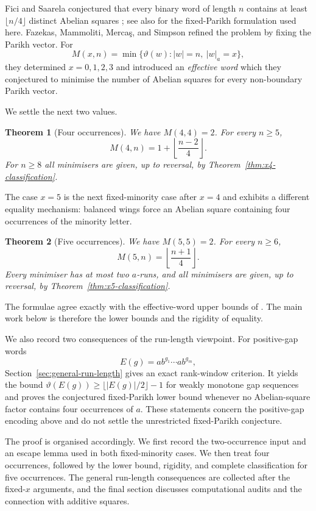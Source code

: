 \documentclass[11pt]{article}
\newtheorem{theorem}{Theorem}[section]
\theoremstyle{definition}
\newcommand{\thetaas}{\vartheta}
\begin{document}
Fici and Saarela conjectured that every binary word of length $n$ contains at least $\lfloor n/4\rfloor$ distinct Abelian squares \cite{FiciSaarela2014}; see also \cite{FMMS2026} for the fixed-Parikh formulation used here. Fazekas, Mammoliti, Merca\c{s}, and Simpson \cite{FMMS2026} refined the problem by fixing the Parikh vector. For
\[
 M(x,n)=\min\{\thetaas(w):|w|=n,\ |w|_a=x\},
\]
they determined $x=0,1,2,3$ and introduced an \emph{effective word} which they conjectured to minimise the number of Abelian squares for every non-boundary Parikh vector.

We settle the next two values.

\begin{theorem}[Four occurrences]\label{thm:x4-main}
We have $M(4,4)=2$. For every $n\ge5$,
\[
 M(4,n)=1+\left\lfloor\frac{n-2}{4}\right\rfloor.
\]
For $n\ge8$ all minimisers are given, up to reversal, by Theorem~\ref{thm:x4-classification}.
\end{theorem}

The case $x=5$ is the next fixed-minority case after $x=4$ and exhibits a different equality mechanism: balanced wings force an Abelian square containing four occurrences of the minority letter.

\begin{theorem}[Five occurrences]\label{thm:x5-main}
We have $M(5,5)=2$. For every $n\ge6$,
\[
 M(5,n)=\left\lfloor\frac{n+1}{4}\right\rfloor.
\]
Every minimiser has at most two $a$-runs, and all minimisers are given, up to reversal, by Theorem~\ref{thm:x5-classification}.
\end{theorem}

The formulae agree exactly with the effective-word upper bounds of \cite[Theorem~12]{FMMS2026}. The main work below is therefore the lower bounds and the rigidity of equality.

We also record two consequences of the run-length viewpoint.  For positive-gap words
\[
 E(g)=ab^{g_1}\cdots ab^{g_m},
\]
Section~\ref{sec:general-run-length} gives an exact rank-window criterion.  It yields the bound $\thetaas(E(g))\ge\lfloor |E(g)|/2\rfloor-1$ for weakly monotone gap sequences and proves the conjectured fixed-Parikh lower bound whenever no Abelian-square factor contains four occurrences of $a$.  These statements concern the positive-gap encoding above and do not settle the unrestricted fixed-Parikh conjecture.

The proof is organised accordingly.  We first record the two-occurrence input and an escape lemma used in both fixed-minority cases.  We then treat four occurrences, followed by the lower bound, rigidity, and complete classification for five occurrences.  The general run-length consequences are collected after the fixed-$x$ arguments, and the final section discusses computational audits and the connection with additive squares.
\end{document}
